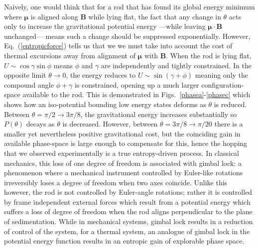 \documentclass[aps,prl,reprint,twocolumn,superscriptaddress,showpacs]{revtex4-1}
\newcommand{\vcrm}[1]{\mathbf{#1}}
\newcommand{\vc}[1]{\boldsymbol{#1}}
\begin{document}
Naively, one would think that for a rod that has found its global energy minimum where $\vc{\mu}$ is aligned along $\vcrm{B}$ while lying flat, the fact that any change in $\theta$ acts only to increase the gravitational potential energy ---while leaving $\vc{\mu}\cdot\vcrm{B} $ unchanged--- means such a change should be suppressed exponentially. However, Eq.\ (\ref{entropicforce}) tells us that we we must take into account the cost of thermal excursions away from alignment of $\vc{\mu}$ with $\vcrm{B}$. When the rod is lying flat, $U\sim \cos\gamma\sin\phi$ means $\phi$ and $\gamma$ are independently and tightly constrained. In the opposite limit $\theta\rightarrow0$, the energy reduces to $U\sim \sin(\gamma+\phi)$ meaning only the compound angle $\phi+\gamma$ is constrained, opening up a much larger configuration-space available to the rod. This is demonstrated in Figs.\ \ref{phasea}-\ref{phasec} which shows how an iso-potential bounding low energy states deforms as $\theta$ is reduced. Between $\theta=\pi/2\rightarrow 3\pi/8$, the gravitational energy increases substantially so $P(\theta)$ decays as $\theta$ is decreased. However, between $\theta=3\pi/8\rightarrow\pi/20$ there is a smaller yet nevertheless positive gravitational cost, but the coinciding gain in available phase-space is large enough to compensate for this, hence the hopping that we observed experimentally is a true entropy-driven process. In classical mechanics, this loss of one degree of freedom is associated with gimbal lock: a phenomenon where a mechanical instrument controlled by Euler-like rotations irreversibly loses a degree of freedom when two axes coincide. Unlike this however, the rod is not controlled by Euler-angle rotations; rather it is controlled by frame independent external forces which result from a potential energy which suffers a loss of degree of freedom when the rod aligns perpendicular to the plane of sedimentation. While in mechanical systems, gimbal lock results in a reduction of control of the system, for a thermal system, an analogue of gimbal lock in the potential energy function results in an entropic gain of explorable phase space.
\end{document}
